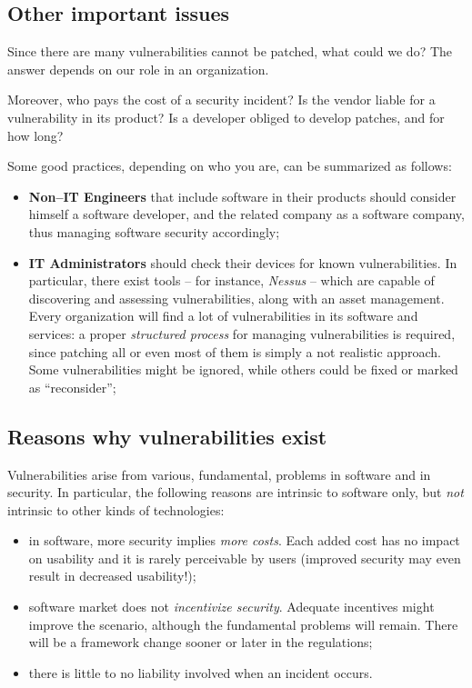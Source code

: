 \documentclass[10pt]{extbook}
\begin{document}
\subsection{Other important issues}

Since there are many vulnerabilities cannot be patched, what could we do? The
answer depends on our role in an organization.

Moreover, who pays the cost of a security incident? Is the vendor liable for a
vulnerability in its product? Is a developer obliged to develop patches, and
for how long?

Some good practices, depending on who you are, can be summarized as follows:

\begin{itemize}
    \item \textbf{Non--IT Engineers} that include software in their products
        should consider himself a software developer, and the related company
        as a software company, thus managing software security accordingly;
    \item \textbf{IT Administrators} should check their devices for known
        vulnerabilities. In particular, there exist tools -- for instance,
        \emph{Nessus} -- which are capable of discovering and assessing
        vulnerabilities, along with an asset management. Every organization
        will find a lot of vulnerabilities in its software and services: a
        proper \emph{structured process} for managing vulnerabilities is
        required, since patching all or even most of them is simply a not
        realistic approach. Some vulnerabilities might be ignored, while others
        could be fixed or marked as ``reconsider'';
\end{itemize}


\subsection{Reasons why vulnerabilities exist}

Vulnerabilities arise from various, fundamental, problems in software and in
security. In particular, the following reasons are intrinsic to software only,
but \emph{not} intrinsic to other kinds of technologies:
\begin{itemize}
    \item in software, more security implies \emph{more costs}. Each added cost
        has no impact on usability and it is rarely perceivable by users
        (improved security may even result in decreased usability!);
    \item software market does not \emph{incentivize security}. Adequate
        incentives might improve the scenario, although the fundamental
        problems will remain. There will be a framework change sooner or later
        in the regulations;
    \item there is little to no liability involved when an incident occurs.
\end{itemize}
\end{document}
